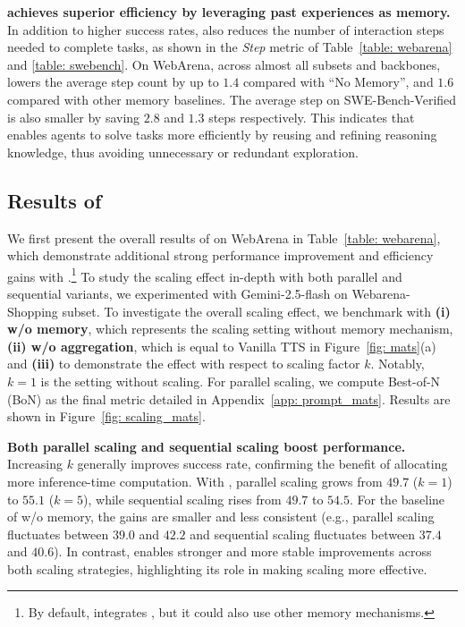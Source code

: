 \noindent\textbf{\ours{} achieves superior efficiency by leveraging past experiences as memory.}
In addition to higher success rates, \ours{} also reduces the number of interaction steps needed to complete tasks, as shown in the \textit{Step} metric of Table~\ref{table: webarena} and \ref{table: swebench}. On WebArena, across almost all subsets and backbones, \ours{} lowers the average step count by up to $1.4$ compared with ``No Memory'', and $1.6$ compared with other memory baselines. The average step on SWE-Bench-Verified is also smaller by saving $2.8$ and $1.3$ steps respectively. This indicates that \ours{} enables agents to solve tasks more efficiently by reusing and refining reasoning knowledge, thus avoiding unnecessary or redundant exploration.




\subsection{Results of \mats{}}\label{sec: res_mats}


We first present the overall results of \mats{} on WebArena in Table~\ref{table: webarena}, which demonstrate additional strong performance improvement and efficiency gains with \ours{}.\footnote{By default, \mats{} integrates \ours{}, but it could also use other memory mechanisms.} To study the scaling effect in-depth with both parallel and sequential variants, we experimented \mats{} with Gemini-2.5-flash on Webarena-Shopping subset. To investigate the overall scaling effect, we benchmark with \textbf{(i) \mats{} w/o memory}, which represents the scaling setting without memory mechanism, \textbf{(ii) \mats{} w/o aggregation}, which is equal to Vanilla TTS in Figure~\ref{fig: mats}(a) and \textbf{(iii) \mats{}} to demonstrate the effect with respect to scaling factor $k$. Notably, $k=1$ is the setting without scaling. For parallel scaling, we compute Best-of-N (BoN) as the final metric detailed in Appendix~\ref{app: prompt_mats}. Results are shown in Figure~\ref{fig: scaling_mats}.


\noindent\textbf{Both parallel scaling and sequential scaling boost performance.}
Increasing $k$ generally improves success rate, confirming the benefit of allocating more inference-time computation. With \mats{}, parallel scaling grows from $49.7$ ($k=1$) to $55.1$ ($k=5$), while sequential scaling rises from $49.7$ to $54.5$. For the baseline of \mats{} w/o memory, the gains are smaller and less consistent (e.g., parallel scaling fluctuates between $39.0$ and $42.2$ and sequential scaling fluctuates between $37.4$ and $40.6$). In contrast, \mats{} enables stronger and more stable improvements across both scaling strategies, highlighting its role in making scaling more effective.

